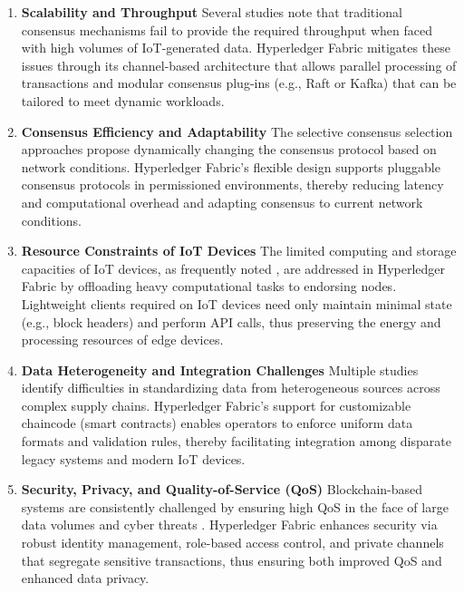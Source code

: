 \documentclass[12pt,onecolumn]{IEEEtran} %
\begin{document}
\begin{enumerate}
\item \textbf{Scalability and Throughput}  
   Several studies \cite{ali2022blockchainenabledarchitecture, demestichas2020blockchaininagriculture} note that traditional consensus mechanisms fail to provide the required throughput when faced with high volumes of IoT-generated data. Hyperledger Fabric mitigates these issues through its channel-based architecture that allows parallel processing of transactions and modular consensus plug-ins (e.g., Raft or Kafka) that can be tailored to meet dynamic workloads.

\item \textbf{Consensus Efficiency and Adaptability}  
   The selective consensus selection approaches \cite{ali2022blockchainenabledarchitecture} propose dynamically changing the consensus protocol based on network conditions. Hyperledger Fabric's flexible design supports pluggable consensus protocols in permissioned environments, thereby reducing latency and computational overhead and adapting consensus to current network conditions.

\item \textbf{Resource Constraints of IoT Devices}  
   The limited computing and storage capacities of IoT devices, as frequently noted \cite{ali2022blockchainenabledarchitecture, aliyu2023blockchainbasedsmartfarm}, are addressed in Hyperledger Fabric by offloading heavy computational tasks to endorsing nodes. Lightweight clients required on IoT devices need only maintain minimal state (e.g., block headers) and perform API calls, thus preserving the energy and processing resources of edge devices.

\item \textbf{Data Heterogeneity and Integration Challenges}  
   Multiple studies \cite{bosona2023theroleof, chandan2023achievingunsdgs} identify difficulties in standardizing data from heterogeneous sources across complex supply chains. Hyperledger Fabric's support for customizable chaincode (smart contracts) enables operators to enforce uniform data formats and validation rules, thereby facilitating integration among disparate legacy systems and modern IoT devices.

\item \textbf{Security, Privacy, and Quality-of-Service (QoS)}  
   Blockchain-based systems are consistently challenged by ensuring high QoS in the face of large data volumes and cyber threats \cite{aliyu2023blockchainbasedsmartfarm, demestichas2020blockchaininagriculture}. Hyperledger Fabric enhances security via robust identity management, role-based access control, and private channels that segregate sensitive transactions, thus ensuring both improved QoS and enhanced data privacy.


\end{enumerate}
\end{document}
